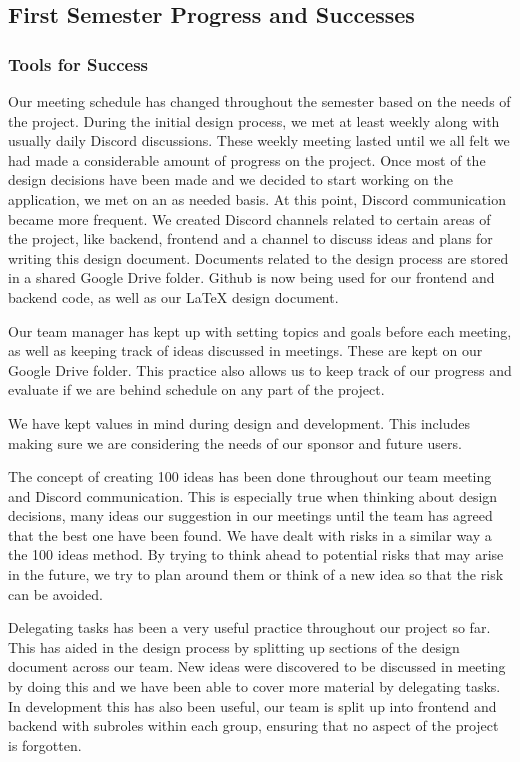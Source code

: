 \subsection{First Semester Progress and Successes}
\subsubsection{Tools for Success}
Our meeting schedule has changed throughout the semester based on the needs of the project. During the initial design process, we met at least weekly along with usually daily Discord discussions. These weekly meeting lasted until we all felt we had made a considerable amount of progress on the project. Once most of the design decisions have been made and we decided to start working on the application, we met on an as needed basis. At this point, Discord communication became more frequent. We created Discord channels related to certain areas of the project, like backend, frontend and a channel to discuss ideas and plans for writing this design document. Documents related to the design process are stored in a shared Google Drive folder. Github is now being used for our frontend and backend code, as well as our LaTeX design document. \par
Our team manager has kept up with setting topics and goals before each meeting, as well as keeping track of ideas discussed in meetings. These are kept on our Google Drive folder. This practice also allows us to keep track of our progress and evaluate if we are behind schedule on any part of the project. \par
We have kept values in mind during design and development. This includes making sure we are considering the needs of our sponsor and future users. \par
The concept of creating 100 ideas has been done throughout our team meeting and Discord communication. This is especially true when thinking about design decisions, many ideas our suggestion in our meetings until the team has agreed that the best one have been found. We have dealt with risks in a similar way a the 100 ideas method. By trying to think ahead to potential risks that may arise in the future, we try to plan around them or think of a new idea so that the risk can be avoided. \par
Delegating tasks has been a very useful practice throughout our project so far. This has aided in the design process by splitting up sections of the design document across our team. New ideas were discovered to be discussed in meeting by doing this and we have been able to cover more material by delegating tasks. In development this has also been useful, our team is split up into frontend and backend with subroles within each group, ensuring that no aspect of the project is forgotten. \par

